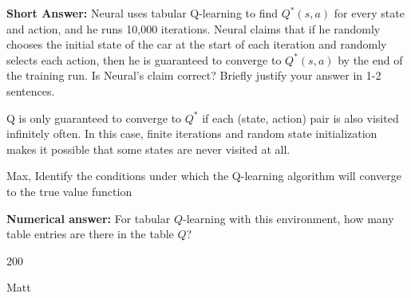 \begin{parts}
\begin{subparts}
\subpart[2] \textbf{Short Answer:}  Neural uses tabular Q-learning to find $Q^*(s,a)$ for every state and action, and he runs 10,000 iterations. Neural claims that if he randomly chooses the initial state of the car at the start of each iteration and randomly selects each action, then he is guaranteed to converge to $Q^*(s,a)$ by the end of the training run. Is Neural's claim correct? Briefly justify your answer in 1-2 sentences.
    \fillwithlines{7em}
    \begin{soln} 
        Q is only guaranteed to converge to $Q^*$ if each (state, action) pair is also visited infinitely often. In this case, finite iterations and random state initialization makes it possible that some states are never visited at all.
    \end{soln}
    \begin{qauthor}
        Max, Identify the conditions under which the Q-learning algorithm will converge to the true value function
    \end{qauthor}




\subpart[1] \textbf{Numerical answer:} For tabular $Q$-learning with this environment, how many table entries are there in the table $Q$?
    \begin{tcolorbox}[fit,height=1cm, width=4cm, blank, borderline={1pt}{-2pt}]
    \end{tcolorbox}
    \begin{soln}
    200
    \end{soln}
    \begin{qauthor}
    Matt
    \end{qauthor}


\end{subparts}
\end{parts}
